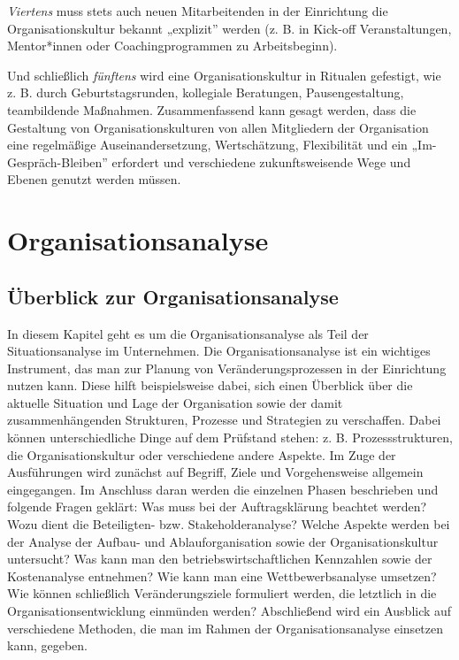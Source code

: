 \documentclass[
  letterpaper,
]{book}
\begin{document}
\emph{Viertens} muss stets auch neuen Mitarbeitenden in der Einrichtung
die Organisationskultur bekannt „explizit'' werden (z. B. in Kick-off
Veranstaltungen, Mentor*innen oder Coachingprogrammen zu Arbeitsbeginn).

Und schließlich \emph{fünftens} wird eine Organisationskultur in
Ritualen gefestigt, wie z. B. durch Geburtstagsrunden, kollegiale
Beratungen, Pausengestaltung, teambildende Maßnahmen. Zusammenfassend
kann gesagt werden, dass die Gestaltung von Organisationskulturen von
allen Mitgliedern der Organisation eine regelmäßige Auseinandersetzung,
Wertschätzung, Flexibilität und ein „Im-Gespräch-Bleiben'' erfordert und
verschiedene zukunftsweisende Wege und Ebenen genutzt werden müssen.

\section{Organisationsanalyse}\label{organisationsanalyse}

\subsection{Überblick zur
Organisationsanalyse}\label{berblick-zur-organisationsanalyse}

In diesem Kapitel geht es um die Organisationsanalyse als Teil der
Situationsanalyse im Unternehmen. Die Organisationsanalyse ist ein
wichtiges Instrument, das man zur Planung von Veränderungsprozessen in
der Einrichtung nutzen kann. Diese hilft beispielsweise dabei, sich
einen Überblick über die aktuelle Situation und Lage der Organisation
sowie der damit zusammenhängenden Strukturen, Prozesse und Strategien zu
verschaffen. Dabei können unterschiedliche Dinge auf dem Prüfstand
stehen: z. B. Prozessstrukturen, die Organisationskultur oder
verschiedene andere Aspekte. Im Zuge der Ausführungen wird zunächst auf
Begriff, Ziele und Vorgehensweise allgemein eingegangen. Im Anschluss
daran werden die einzelnen Phasen beschrieben und folgende Fragen
geklärt: Was muss bei der Auftragsklärung beachtet werden? Wozu dient
die Beteiligten- bzw. Stakeholderanalyse? Welche Aspekte werden bei der
Analyse der Aufbau- und Ablauforganisation sowie der Organisationskultur
untersucht? Was kann man den betriebswirtschaftlichen Kennzahlen sowie
der Kostenanalyse entnehmen? Wie kann man eine Wettbewerbsanalyse
umsetzen? Wie können schließlich Veränderungsziele formuliert werden,
die letztlich in die Organisationsentwicklung einmünden werden?
Abschließend wird ein Ausblick auf verschiedene Methoden, die man im
Rahmen der Organisationsanalyse einsetzen kann, gegeben.
\end{document}
